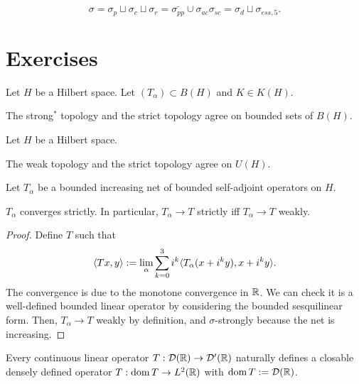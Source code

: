 \documentclass{../../large}
\begin{document}
\[\sigma=\sigma_p\sqcup\sigma_c\sqcup\sigma_r=\bar{\sigma_{pp}}\cup\sigma_{ac}\sigma_{sc}=\sigma_d\sqcup\sigma_{ess,5}.\]





\section*{Exercises}


\begin{prb}
Let $H$ be a Hilbert space.
Let $(T_\alpha)\subset B(H)$ and $K\in K(H)$.
\begin{parts}
\item The strong$^*$ topology and the strict topology agree on bounded sets of $B(H)$.
\end{parts}
\end{prb}

\begin{prb}
Let $H$ be a Hilbert space.
\begin{parts}
\item The weak topology and the strict topology agree on $U(H)$.
\end{parts}
\end{prb}


\begin{prb}
Let $T_\alpha$ be a bounded increasing net of bounded self-adjoint operators on $H$.
\begin{parts}
\item $T_\alpha$ converges strictly. In particular, $T_\alpha\to T$ strictly iff $T_\alpha\to T$ weakly.
\end{parts}
\end{prb}
\begin{proof}
Define $T$ such that
\[\langle Tx,y\rangle:=\lim_\alpha\sum_{k=0}^3i^k\langle T_\alpha(x+i^ky),x+i^ky\rangle.\]
The convergence is due to the monotone convergence in $\mathbb{R}$.
We can check it is a well-defined bounded linear operator by considering the bounded sesquilinear form.
Then, $T_\alpha\to T$ weakly by definition, and $\sigma$-strongly because the net is increasing.
\end{proof}




\begin{prb}
\begin{parts}
\item Every continuous linear operator $T:\mathcal{D}(\mathbb{R})\to\mathcal{D}'(\mathbb{R})$ naturally defines a closable densely defined operator $T:\operatorname{dom} T\to L^2(\mathbb{R})$ with $\operatorname{dom} T:=\mathcal{D}(\mathbb{R})$.
\end{parts}
\end{prb}
\end{document}
